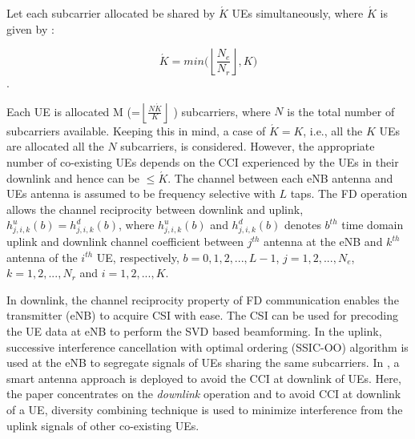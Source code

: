 \documentclass[conference]{IEEEtran}
\begin{document}
  Let each subcarrier allocated be shared by $\acute{K}$ UEs simultaneously, where $\acute{K}$ is given by \cite{sc_fdma}:
  
  \begin{equation}
      \label{one}
     \acute{K} = min\Big( \left \lfloor{\frac{N_e}{N_r}}\right \rfloor ,K \Big) 
\end{equation}. 

Each UE is allocated M (=$\left \lfloor{\frac{N\acute{K}}{K}}\right \rfloor$ ) subcarriers, where $N$ is the total number of subcarriers available.  Keeping this in mind, a case of $\acute{K}=K$, i.e., all the $K$ UEs are allocated all the $N$ subcarriers, is considered. However, the appropriate number of co-existing UEs depends on the CCI experienced by the UEs in their downlink and hence can be $\leq \acute{K}$. The channel between each eNB antenna and UEs antenna is assumed to be frequency selective with $L$ taps. The FD operation allows the channel reciprocity between downlink and uplink, $h^{u}_{j,i,k} (b) = h^{d}_{j,i,k} (b)$, where  $ h^{u}_{j,i,k} (b)$ and $h^{d}_{j,i,k} (b) $  denotes $b^{th}$ time domain  uplink and downlink channel coefficient between $j^{th}$ antenna at the eNB and $k^{th}$  antenna of the $i^{th}$ UE, respectively, $b = 0, 1, 2, ... , L-1$, $j = 1 , 2, ..., N_e$, $k = 1, 2,...,N_r $ and $i = 1,2, ...,K$. \par

     In downlink, the channel reciprocity property of FD communication enables the transmitter (eNB) to acquire CSI with ease. The CSI can be used for precoding the UE data at eNB to perform the SVD based beamforming. In the uplink, successive interference cancellation with optimal ordering (SSIC-OO) algorithm \cite{ants} is used at the eNB to segregate signals of UEs sharing the same subcarriers. In \cite{ants}, a smart antenna approach is deployed to avoid the CCI at downlink of UEs. Here, the paper concentrates on the \textit{downlink} operation and to avoid CCI at downlink of a UE, diversity combining technique is used to minimize interference from the uplink signals of other co-existing UEs. \par

\end{document}

